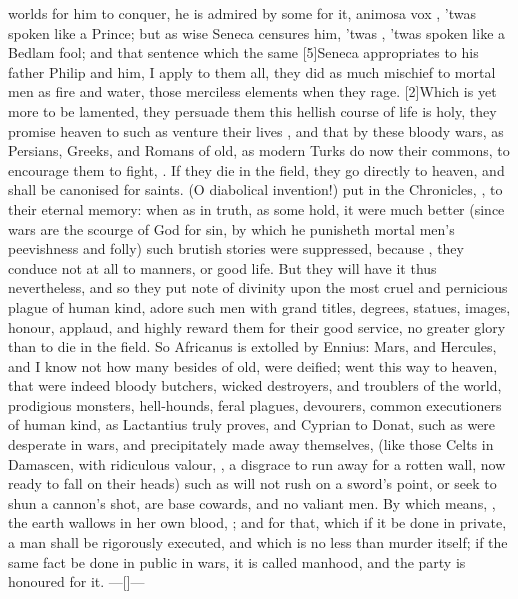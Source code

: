 {worlds for him to conquer, he is admired by some for it, animosa vox
, 'twas spoken like a Prince; but as wise Seneca
censures him, 'twas , 'twas spoken like a
Bedlam fool; and that sentence which the same [5\baselineskip]Seneca appropriates
to his father Philip and him, I apply to them all,  they
did as much mischief to mortal men as fire and water, those merciless
elements when they rage. [2\baselineskip]Which is yet more to be lamented, they
persuade them this hellish course of life is holy, they promise heaven
to such as venture their lives , and that by these bloody
wars, as Persians, Greeks, and Romans of old, as modern Turks do now
their commons, to encourage them to fight, . If
they die in the field, they go directly to heaven, and shall be
canonised for saints. (O diabolical invention!) put in the Chronicles,
, to their eternal memory: when as in truth,
as some hold, it were much better (since wars are the scourge of
God for sin, by which he punisheth mortal men's peevishness and folly)
such brutish stories were suppressed, because , they conduce not at all to manners, or good life. But
they will have it thus nevertheless, and so they put note of
divinity upon the most cruel and pernicious plague of human kind,
adore such men with grand titles, degrees, statues, images,
honour, applaud, and highly reward them for their good service, no
greater glory than to die in the field. So Africanus is extolled by
Ennius: Mars, and Hercules, and I know not how many besides of
old, were deified; went this way to heaven, that were indeed bloody
butchers, wicked destroyers, and troublers of the world, prodigious
monsters, hell-hounds, feral plagues, devourers, common executioners of
human kind, as Lactantius truly proves, and Cyprian to Donat, such as
were desperate in wars, and precipitately made away themselves, (like
those Celts in Damascen, with ridiculous valour, , a disgrace to run away for a rotten
wall, now ready to fall on their heads) such as will not rush on a
sword's point, or seek to shun a cannon's shot, are base cowards, and
no valiant men. By which means, , the earth
wallows in her own blood,
; and for that, which
if it be done in private, a man shall be rigorously executed, and
which is no less than murder itself; if the same fact be done in public
in wars, it is called manhood, and the party is honoured for it.
---[\baselineskip]---

}
